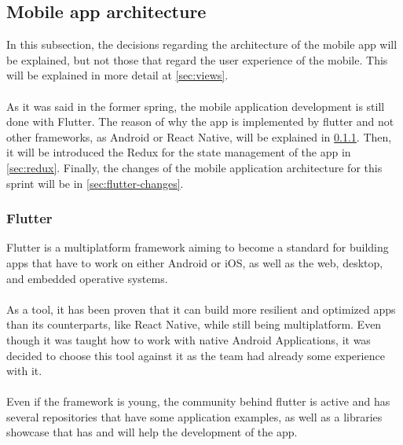 \documentclass[./main.tex]{subfiles}
\begin{document}
	\subsection{Mobile app architecture}
	In this subsection, the decisions regarding the architecture of the mobile app will
	be explained, but not those that regard the user experience of the mobile. This 
	will be explained in more detail at  \ref{sec:views}.\\
	\\
	As it was said in the former spring, the mobile application development is still done with Flutter. The reason of why the app is implemented by flutter and not other frameworks, as Android or React Native,
	will be explained in
	 \ref{sec:flutter}.
	Then, it will be introduced the Redux for the state management	of the app  in \ref{sec:redux}. Finally, the changes of the mobile application architecture for this sprint will be in \ref{sec:flutter-changes}.
	\subsubsection{Flutter}
	\label{sec:flutter}
	Flutter is a multiplatform framework aiming to become a standard for building apps that have to work on either Android or iOS, as well as the web, desktop, and embedded operative systems. \\
	\\
	As a tool, it has been proven that it can build more resilient and optimized apps than its counterparts, like React Native, while still being multiplatform. Even though it was taught how to work with native Android Applications, it was decided to choose this tool against it as the team had already some experience with it.\\
	\\
	Even if the framework is young, the community behind flutter is active and has several repositories that have some application examples, as well as a libraries showcase that has and will help the development of the app.
\end{document}
